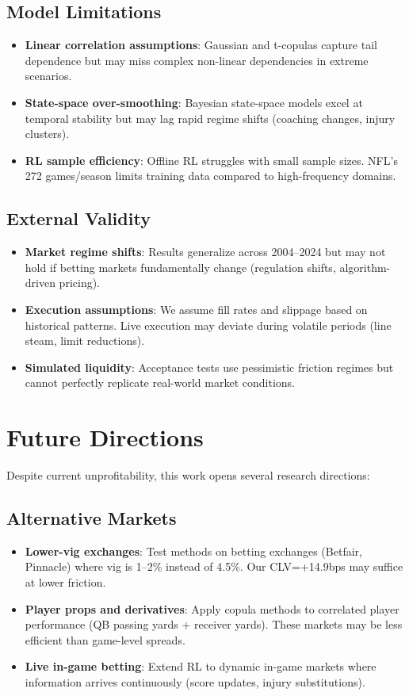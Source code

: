 \subsection{Model Limitations}
\begin{itemize}
  \item \textbf{Linear correlation assumptions}: Gaussian and t-copulas capture tail dependence but may miss complex non-linear dependencies in extreme scenarios.
  \item \textbf{State-space over-smoothing}: Bayesian state-space models excel at temporal stability but may lag rapid regime shifts (coaching changes, injury clusters).
  \item \textbf{RL sample efficiency}: Offline RL struggles with small sample sizes. NFL's 272 games/season limits training data compared to high-frequency domains.
\end{itemize}

\subsection{External Validity}
\begin{itemize}
  \item \textbf{Market regime shifts}: Results generalize across 2004--2024 but may not hold if betting markets fundamentally change (regulation shifts, algorithm-driven pricing).
  \item \textbf{Execution assumptions}: We assume fill rates and slippage based on historical patterns. Live execution may deviate during volatile periods (line steam, limit reductions).
  \item \textbf{Simulated liquidity}: Acceptance tests use pessimistic friction regimes but cannot perfectly replicate real-world market conditions.
\end{itemize}

\section{Future Directions}

Despite current unprofitability, this work opens several research directions:

\subsection{Alternative Markets}
\begin{itemize}
  \item \textbf{Lower-vig exchanges}: Test methods on betting exchanges (Betfair, Pinnacle) where vig is 1--2\% instead of 4.5\%. Our CLV=+14.9bps may suffice at lower friction.
  \item \textbf{Player props and derivatives}: Apply copula methods to correlated player performance (QB passing yards + receiver yards). These markets may be less efficient than game-level spreads.
  \item \textbf{Live in-game betting}: Extend RL to dynamic in-game markets where information arrives continuously (score updates, injury substitutions).
\end{itemize}

